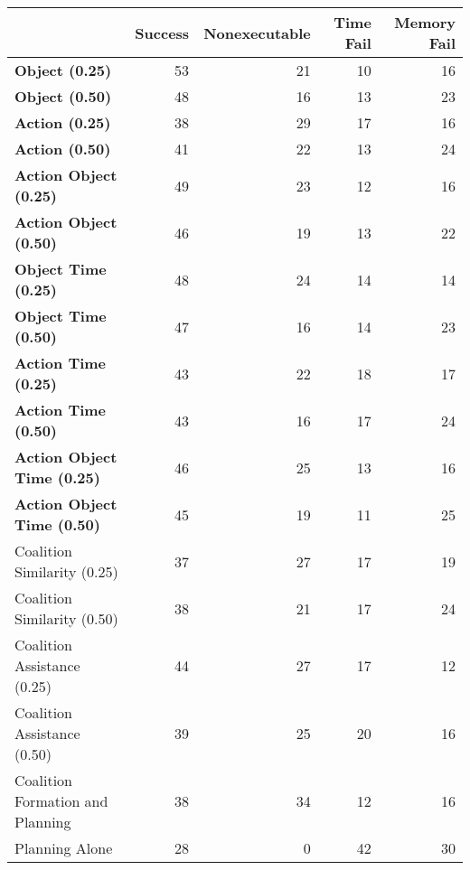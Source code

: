 \begin{tabular}{lrrrr}
\hline
                                    &   Success &   Nonexecutable &   Time Fail &   Memory Fail \\
\hline
 \textbf{Object (0.25)}             &        53 &              21 &          10 &            16 \\
 \textbf{Object (0.50)}             &        48 &              16 &          13 &            23 \\
 \textbf{Action (0.25)}             &        38 &              29 &          17 &            16 \\
 \textbf{Action (0.50)}             &        41 &              22 &          13 &            24 \\
 \textbf{Action Object (0.25)}      &        49 &              23 &          12 &            16 \\
 \textbf{Action Object (0.50)}      &        46 &              19 &          13 &            22 \\
 \textbf{Object Time (0.25)}        &        48 &              24 &          14 &            14 \\
 \textbf{Object Time (0.50)}        &        47 &              16 &          14 &            23 \\
 \textbf{Action Time (0.25)}        &        43 &              22 &          18 &            17 \\
 \textbf{Action Time (0.50)}        &        43 &              16 &          17 &            24 \\
 \textbf{Action Object Time (0.25)} &        46 &              25 &          13 &            16 \\
 \textbf{Action Object Time (0.50)} &        45 &              19 &          11 &            25 \\
 Coalition Similarity (0.25)        &        37 &              27 &          17 &            19 \\
 Coalition Similarity (0.50)        &        38 &              21 &          17 &            24 \\
 Coalition Assistance (0.25)        &        44 &              27 &          17 &            12 \\
 Coalition Assistance (0.50)        &        39 &              25 &          20 &            16 \\
 Coalition Formation and Planning   &        38 &              34 &          12 &            16 \\
 Planning Alone                     &        28 &               0 &          42 &            30 \\
\hline
\end{tabular}
